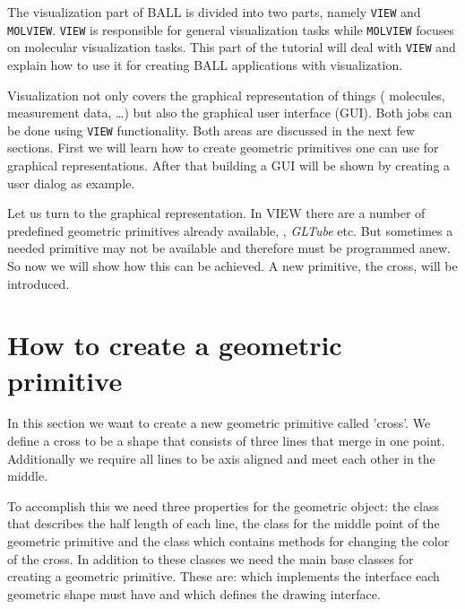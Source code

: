 The visualization part of BALL is divided into two parts, namely {\tt VIEW}
and {\tt MOLVIEW}. {\tt VIEW} is responsible for general visualization tasks
while {\tt MOLVIEW} focuses on molecular visualization tasks. This part of the
tutorial will deal with {\tt VIEW} and explain how to use it for creating BALL
applications with visualization.

Visualization not only covers the graphical representation of things (\eg
molecules, measurement data, \dots) but also the graphical user interface
(GUI). Both jobs can be done using {\tt VIEW} functionality. Both areas are
discussed in the next few sections. First we will learn how to create
geometric primitives one can use for graphical representations. After that
building a GUI will be shown by creating a user dialog as example.

Let us turn to the graphical representation. In VIEW there are a number of
predefined geometric primitives already available, , {\em
GLTube} etc. But sometimes a needed primitive may not be available and
therefore must be programmed anew. So now we will show how this can be
achieved. A new primitive, the cross, will be introduced.

\section{How to create a geometric primitive}
\label{section:view_create_a_geometric_primitive}

In this section we want to create a new geometric primitive called 'cross'.
We define a cross to be a shape that consists of three lines that merge in one
point. Additionally we require all lines to be axis aligned and meet each
other in the middle.

To accomplish this we need three properties for the geometric object: the
class  that describes the half length of each line, the class 
 for the middle point of the geometric primitive and the class 
 which contains methods for changing the color of the
cross. In addition to these classes we need the main base classes for
creating a geometric primitive. These are:  which
implements the interface each geometric shape must have and 
which defines the drawing interface.


